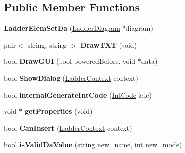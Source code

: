 \subsection*{Public Member Functions}
\begin{DoxyCompactItemize}
\item 
\hypertarget{class_ladder_elem_set_da_a11f09cb31790b7701d06d355874913cb}{{\bfseries Ladder\-Elem\-Set\-Da} (\hyperlink{class_ladder_diagram}{Ladder\-Diagram} $\ast$diagram)}\label{class_ladder_elem_set_da_a11f09cb31790b7701d06d355874913cb}

\item 
\hypertarget{class_ladder_elem_set_da_a464038a097363a7c8b990155c1557dfd}{pair$<$ string, string $>$ {\bfseries Draw\-T\-X\-T} (void)}\label{class_ladder_elem_set_da_a464038a097363a7c8b990155c1557dfd}

\item 
\hypertarget{class_ladder_elem_set_da_a5484cb40622e3406243fac5e19a2f5b6}{bool {\bfseries Draw\-G\-U\-I} (bool powered\-Before, void $\ast$data)}\label{class_ladder_elem_set_da_a5484cb40622e3406243fac5e19a2f5b6}

\item 
\hypertarget{class_ladder_elem_set_da_acf9653c802b9c67827d68df188bcb752}{bool {\bfseries Show\-Dialog} (\hyperlink{struct_ladder_context}{Ladder\-Context} context)}\label{class_ladder_elem_set_da_acf9653c802b9c67827d68df188bcb752}

\item 
\hypertarget{class_ladder_elem_set_da_ae67decbd2195a52b15f4201619e13085}{bool {\bfseries internal\-Generate\-Int\-Code} (\hyperlink{class_int_code}{Int\-Code} \&ic)}\label{class_ladder_elem_set_da_ae67decbd2195a52b15f4201619e13085}

\item 
\hypertarget{class_ladder_elem_set_da_a449fb4013e8631ce1661062e9c6cb842}{void $\ast$ {\bfseries get\-Properties} (void)}\label{class_ladder_elem_set_da_a449fb4013e8631ce1661062e9c6cb842}

\item 
\hypertarget{class_ladder_elem_set_da_a28980478d54de2547759ab45f112875e}{bool {\bfseries Can\-Insert} (\hyperlink{struct_ladder_context}{Ladder\-Context} context)}\label{class_ladder_elem_set_da_a28980478d54de2547759ab45f112875e}

\item 
\hypertarget{class_ladder_elem_set_da_abb2580f9ed193439125659d806cde746}{bool {\bfseries is\-Valid\-Da\-Value} (string new\-\_\-name, int new\-\_\-mode)}\label{class_ladder_elem_set_da_abb2580f9ed193439125659d806cde746}


\end{DoxyCompactItemize}
